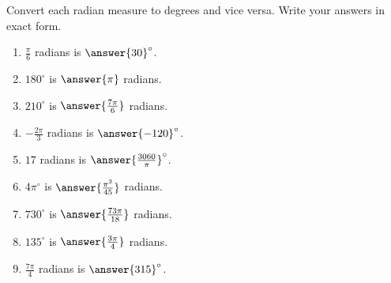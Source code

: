 \documentclass{ximera}
\author{Kenneth Berglund}
\begin{document}
\begin{exercise}
Convert each radian measure to degrees and vice versa. Write your answers in exact form. 

\begin{enumerate}
\item $\frac{\pi}{6}$ radians is $\answer{30}^\circ$.
\item $180^\circ$ is $\answer{\pi}$ radians.
\item $210^\circ$ is $\answer{\frac{7\pi}{6}}$ radians.
\item $-\frac{2\pi}{3}$ radians is $\answer{-120}^\circ$.
\item $17$ radians is $\answer{\frac{3060}{\pi}}^\circ$.
\item $4\pi^\circ$ is $\answer{\frac{\pi^2}{45}}$ radians.
\item $730^\circ$ is $\answer{\frac{73\pi}{18}}$ radians.
\item $135^\circ$ is $\answer{\frac{3\pi}{4}}$ radians.
\item $\frac{7\pi}{4}$ radians is $\answer{315}^\circ$.
\end{enumerate}

\end{exercise}
\end{document}
